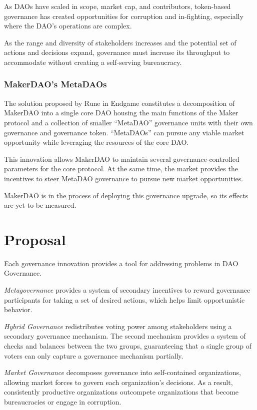\documentclass[
]{article}
\begin{document}
As DAOs have scaled in scope, market cap, and contributors, token-based
governance has created opportunities for corruption and in-fighting,
especially where the DAO's operations are complex.

As the range and diversity of stakeholders increases and the potential
set of actions and decisions expand, governance must increase its
throughput to accommodate without creating a self-serving bureaucracy.

\hypertarget{makerdaos-metadaos}{%
\subsubsection{MakerDAO's MetaDAOs}\label{makerdaos-metadaos}}

The solution proposed by Rune in Endgame constitutes a decomposition of
MakerDAO into a single core DAO housing the main functions of the Maker
protocol and a collection of smaller ``MetaDAO'' governance units with
their own governance and governance token. ``MetaDAOs'' can pursue any
viable market opportunity while leveraging the resources of the core
DAO.

This innovation allows MakerDAO to maintain several
governance-controlled parameters for the core protocol. At the same
time, the market provides the incentives to steer MetaDAO governance to
pursue new market opportunities.

MakerDAO is in the process of deploying this governance upgrade, so its
effects are yet to be measured.
\hypertarget{proposal}{%
\section{Proposal}\label{proposal}}

Each governance innovation provides a tool for addressing problems in
DAO Governance.

\emph{Metagovernance} provides a system of secondary incentives to
reward governance participants for taking a set of desired actions,
which helps limit opportunistic behavior.

\emph{Hybrid Governance} redistributes voting power among stakeholders
using a secondary governance mechanism. The second mechanism provides a
system of checks and balances between the two groups, guaranteeing that
a single group of voters can only capture a governance mechanism
partially.

\emph{Market Governance} decomposes governance into self-contained
organizations, allowing market forces to govern each organization's
decisions. As a result, consistently productive organizations outcompete
organizations that become bureaucracies or engage in corruption.
\end{document}
